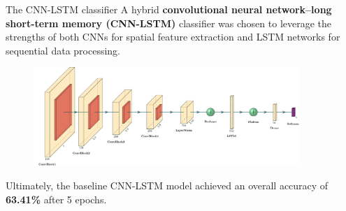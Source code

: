 \documentclass[]{beamer}
\begin{document}
\begin{frame}{The CNN-LSTM classifier}
    \small
    A hybrid \textbf{convolutional neural network--long short-term memory (CNN-LSTM)} classifier was chosen to leverage the strengths of both CNNs for spatial feature extraction and LSTM networks for sequential data processing.

    
    \begin{figure}
        \centering
        \includegraphics[width=0.9\textwidth]{img/architecture_diagram.pdf}
    \end{figure}
    \begin{center}
		Ultimately, the baseline CNN-LSTM model achieved an overall accuracy of \textbf{63.41\%} after 5 epochs.
	\end{center}
\end{frame}

    
        
    
\end{document}
